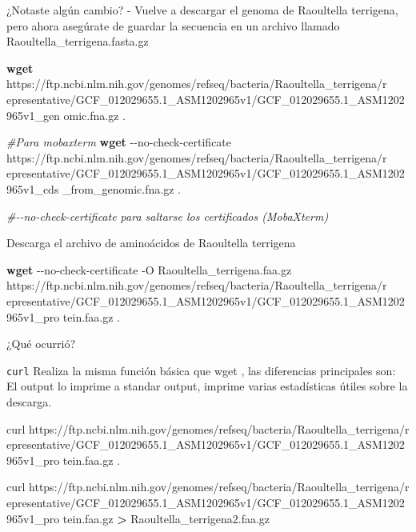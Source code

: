 \documentclass[
]{book}
\newenvironment{Shaded}{\begin{snugshade}}{\end{snugshade}}
\newcommand{\AttributeTok}[1]{\textcolor[rgb]{0.13,0.29,0.53}{#1}}
\newcommand{\CommentTok}[1]{\textcolor[rgb]{0.56,0.35,0.01}{\textit{#1}}}
\newcommand{\ExtensionTok}[1]{#1}
\newcommand{\FunctionTok}[1]{\textcolor[rgb]{0.13,0.29,0.53}{\textbf{#1}}}
\newcommand{\NormalTok}[1]{#1}
\newcommand{\OperatorTok}[1]{\textcolor[rgb]{0.81,0.36,0.00}{\textbf{#1}}}
\begin{document}
¿Notaste algún cambio?
- Vuelve a descargar el genoma de Raoultella terrigena, pero ahora asegúrate de guardar la secuencia en un archivo llamado Raoultella\_terrigena.fasta.gz

\begin{Shaded}
\begin{Highlighting}[]
\FunctionTok{wget}
\ExtensionTok{https://ftp.ncbi.nlm.nih.gov/genomes/refseq/bacteria/Raoultella\_terrigena/r}
\ExtensionTok{epresentative/GCF\_012029655.1\_ASM1202965v1/GCF\_012029655.1\_ASM1202965v1\_gen}
\ExtensionTok{omic.fna.gz}\NormalTok{ .}
\end{Highlighting}
\end{Shaded}

\begin{Shaded}
\begin{Highlighting}[]
\CommentTok{\#Para mobaxterm}
\FunctionTok{wget} \AttributeTok{{-}{-}no{-}check{-}certificate}
\ExtensionTok{https://ftp.ncbi.nlm.nih.gov/genomes/refseq/bacteria/Raoultella\_terrigena/r}
\ExtensionTok{epresentative/GCF\_012029655.1\_ASM1202965v1/GCF\_012029655.1\_ASM1202965v1\_cds}
\ExtensionTok{\_from\_genomic.fna.gz}\NormalTok{ .}

\CommentTok{\#{-}{-}no{-}check{-}certificate para saltarse los certificados (MobaXterm)}
\end{Highlighting}
\end{Shaded}

Descarga el archivo de aminoácidos de Raoultella terrigena

\begin{Shaded}
\begin{Highlighting}[]
\FunctionTok{wget} \AttributeTok{{-}{-}no{-}check{-}certificate} \AttributeTok{{-}O}\NormalTok{ Raoultella\_terrigena.faa.gz}
\ExtensionTok{https://ftp.ncbi.nlm.nih.gov/genomes/refseq/bacteria/Raoultella\_terrigena/r}
\ExtensionTok{epresentative/GCF\_012029655.1\_ASM1202965v1/GCF\_012029655.1\_ASM1202965v1\_pro}
\ExtensionTok{tein.faa.gz}\NormalTok{ .}
\end{Highlighting}
\end{Shaded}

¿Qué ocurrió?

\texttt{curl} Realiza la misma función básica que wget , las diferencias principales son: El output lo imprime a standar output, imprime varias estadísticas útiles sobre la descarga.

\begin{Shaded}
\begin{Highlighting}[]
\ExtensionTok{curl}
\ExtensionTok{https://ftp.ncbi.nlm.nih.gov/genomes/refseq/bacteria/Raoultella\_terrigena/r}
\ExtensionTok{epresentative/GCF\_012029655.1\_ASM1202965v1/GCF\_012029655.1\_ASM1202965v1\_pro}
\ExtensionTok{tein.faa.gz}\NormalTok{ .}

\ExtensionTok{curl}
\ExtensionTok{https://ftp.ncbi.nlm.nih.gov/genomes/refseq/bacteria/Raoultella\_terrigena/r}
\ExtensionTok{epresentative/GCF\_012029655.1\_ASM1202965v1/GCF\_012029655.1\_ASM1202965v1\_pro}
\ExtensionTok{tein.faa.gz} \OperatorTok{\textgreater{}}\NormalTok{ Raoultella\_terrigena2.faa.gz}
\end{Highlighting}
\end{Shaded}
\end{document}
